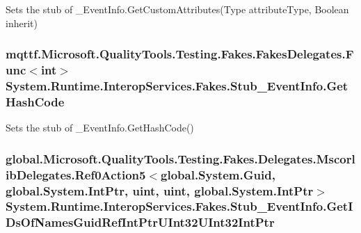 Sets the stub of \-\_\-\-Event\-Info.\-Get\-Custom\-Attributes(\-Type attribute\-Type, Boolean inherit)

\hypertarget{class_system_1_1_runtime_1_1_interop_services_1_1_fakes_1_1_stub___event_info_acc1b5d3b8d23be39054feccccb30703f}{
\subsubsection[{Get\-Hash\-Code}]{\setlength{\rightskip}{0pt plus 5cm}mqttf.\-Microsoft.\-Quality\-Tools.\-Testing.\-Fakes.\-Fakes\-Delegates.\-Func$<$int$>$ System.\-Runtime.\-Interop\-Services.\-Fakes.\-Stub\-\_\-\-Event\-Info.\-Get\-Hash\-Code}}\label{class_system_1_1_runtime_1_1_interop_services_1_1_fakes_1_1_stub___event_info_acc1b5d3b8d23be39054feccccb30703f}


Sets the stub of \-\_\-\-Event\-Info.\-Get\-Hash\-Code()

\hypertarget{class_system_1_1_runtime_1_1_interop_services_1_1_fakes_1_1_stub___event_info_aef7a21dc18b1fb5dca95ee51c19040f5}{
\subsubsection[{Get\-I\-Ds\-Of\-Names\-Guid\-Ref\-Int\-Ptr\-U\-Int32\-U\-Int32\-Int\-Ptr}]{\setlength{\rightskip}{0pt plus 5cm}global.\-Microsoft.\-Quality\-Tools.\-Testing.\-Fakes.\-Delegates.\-Mscorlib\-Delegates.\-Ref0\-Action5$<$global.\-System.\-Guid, global.\-System.\-Int\-Ptr, uint, uint, global.\-System.\-Int\-Ptr$>$ System.\-Runtime.\-Interop\-Services.\-Fakes.\-Stub\-\_\-\-Event\-Info.\-Get\-I\-Ds\-Of\-Names\-Guid\-Ref\-Int\-Ptr\-U\-Int32\-U\-Int32\-Int\-Ptr}}\label{class_system_1_1_runtime_1_1_interop_services_1_1_fakes_1_1_stub___event_info_aef7a21dc18b1fb5dca95ee51c19040f5}



